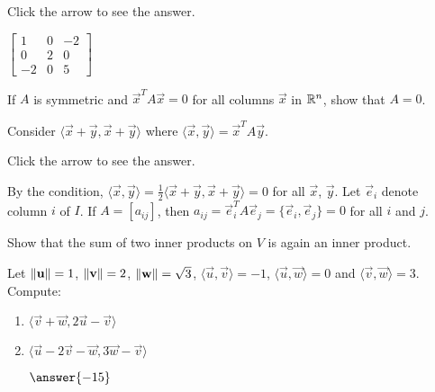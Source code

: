 \documentclass{ximera}
\begin{document}
\begin{problem}
\begin{enumerate}
Click the arrow to see the answer.
\begin{expandable}{}{}
$\left[ \begin{array}{rrr}
1 & 0 & -2 \\
0 & 2 & 0 \\
-2 & 0 & 5
\end{array} \right]$
\end{expandable}

\end{enumerate}
\end{problem}

\begin{problem}\label{prob:inner_prod_14}
If $A$ is symmetric and $\vec{x}^{T}A\vec{x} = 0$ for all columns $\vec{x}$ in $\mathbb{R}^n$, show that $A = 0$. 

\begin{hint}
Consider
$\langle \vec{x} + \vec{y}, \vec{x} + \vec{y} \rangle$ where $\langle \vec{x}, \vec{y} \rangle = \vec{x}^TA\vec{y}$.
\end{hint}

Click the arrow to see the answer.
\begin{expandable}{}{}
By the condition, $\langle \vec{x}, \vec{y} \rangle = \frac{1}{2} \langle \vec{x} + \vec{y}, \vec{x} + \vec{y} \rangle = 0$ for all $\vec{x}$, $\vec{y}$. Let $\vec{e}_{i}$ denote column $i$ of $I$. If $A = \left[ a_{ij} \right]$, then $a_{ij} = \vec{e}_{i}^{T}A\vec{e}_{j} = \{\vec{e}_{i}, \vec{e}_{j}\} = 0$ for all $i$ and $j$.
\end{expandable}
\end{problem}

\begin{problem}\label{prob:inner_prod_15}
Show that the sum of two inner products on $V$ is again an inner product.
\end{problem}

\begin{problem} \label{ex:10_1_16}
Let $ \left\lVert \mathbf{u} \right\rVert = 1$, $\left\lVert \mathbf{v} \right\rVert = 2$, $\left\lVert \mathbf{w} \right\rVert = \sqrt{3} $, $\langle \vec{u}, \vec{v} \rangle = -1$, $\langle\vec{u}, \vec{w}\rangle = 0$ and $\langle\vec{v}, \vec{w}\rangle = 3$. Compute:
\begin{enumerate}
\item $\langle \vec{v} + \vec{w}, 2\vec{u} - \vec{v} \rangle$
\item $\langle \vec{u} - 2 \vec{v} - \vec{w}, 3\vec{w} - \vec{v} \rangle$

$\answer{-15}$
\end{enumerate}

\end{problem}
\end{document}
